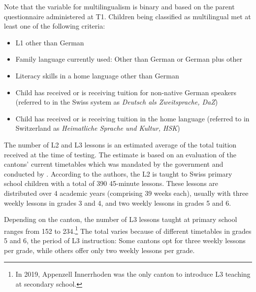 \documentclass[output=paper]{langsci/langscibook}
\begin{document}
Note that the variable for multilingualism is binary and based on the parent questionnaire administered at T1. Children being classified as multilingual met at least one of the following criteria:

\begin{itemize}
\item L1 other than German
\item Family language currently used: Other than German or German plus other
\item Literacy skills in a home language other than German
\item Child has received or is receiving tuition for non-native German speakers (referred to in the Swiss system as \textit{Deutsch als Zweitsprache, DaZ})
\item Child has received or is receiving tuition in the home language (referred to in Switzerland as \textit{Heimatliche Sprache und Kultur, HSK})
\end{itemize}

The number of L2 and L3 lessons is an estimated average of the total tuition received at the time of testing. The estimate is based on an evaluation of the cantons’ current timetables which was mandated by the government and conducted by \citet{BucherZemp2019}. According to the authors, the L2 is taught to Swiss primary school children with a total of 390 45-minute lessons. These lessons are distributed over 4 academic years (comprising 39 weeks each), usually with three weekly lessons in grades 3 and 4, and two weekly lessons in grades 5 and 6.

Depending on the canton, the number of L3 lessons taught at primary school ranges from 152 to 234.\footnote{In 2019, Appenzell Innerrhoden was the only canton to introduce L3 teaching at secondary school.} The total varies because of different timetables in grades 5 and 6, the period of L3 instruction: Some cantons opt for three weekly lessons per grade, while others offer only two weekly lessons per grade. 


\begin{table}
\caption{Participants LAPS I\label{tab:02:2}}
\end{table}
\end{document}
